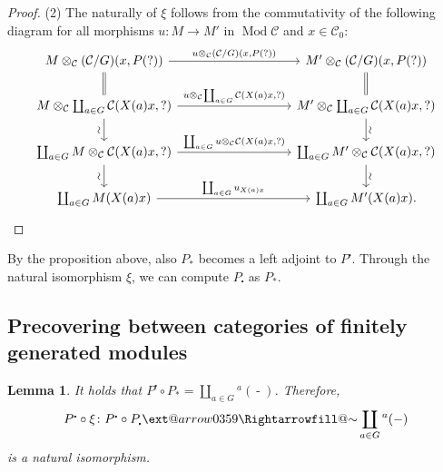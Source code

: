 \documentclass{surv-l}
\makeatletter
\numberwithin{equation}{chapter}
\numberwithin{figure}{chapter}
\theoremstyle{plain}
\newtheorem{lem}[thm]{Lemma}
\theoremstyle{definition}
\theoremstyle{remark}
\newcommand{\Ya}[2][]{\ext@arrow0359\Rightarrowfill@{#1}{#2}}
\newcommand{\Ar}[3]{\ar[from={#1}, to={#2}, #3]}
\DeclareMathOperator{\Mod}{Mod}
\DeclareMathOperator{\blank}{-}
\makeatother
\begin{document}
\begin{proof}
(2) The naturally of $\xi$ follows from the commutativity of the following diagram
for all morphisms $u \colon M \to M'$ in $\Mod{\mathcal{C}}$ and $x \in {\mathcal{C}}_0$:
\begin{equation*}
\begin{tikzcd}[column sep=9em]
M \otimes_{\mathcal{C}} ({\mathcal{C}}/G)(x, P(?)) & M' \otimes_{\mathcal{C}} ({\mathcal{C}}/G)(x, P(?))\\
M \otimes_{\mathcal{C}} \coprod_{a\in G}{\mathcal{C}}(X(a)x, ?) & M' \otimes_{\mathcal{C}} \coprod_{a\in G} {\mathcal{C}}(X(a)x, ?)\\
\coprod_{a\in G} M \otimes_{\mathcal{C}} {\mathcal{C}}(X(a)x, ?) & \coprod_{a\in G} M' \otimes_{\mathcal{C}}  {\mathcal{C}}(X(a)x, ?)\\
\coprod_{a\in G} M(X(a)x) & \coprod_{a\in G} M'(X(a)x).
\Ar{1-1}{1-2}{"{u \otimes_{\mathcal{C}} ({\mathcal{C}}/G)(x, P(?))}"}
\Ar{2-1}{2-2}{"{u \otimes_{\mathcal{C}} \coprod_{a\in G} {\mathcal{C}}(X(a)x, ?)}"}
\Ar{3-1}{3-2}{"{ \coprod_{a\in G} u \otimes_{\mathcal{C}}{\mathcal{C}}(X(a)x, ?)}"}
\Ar{4-1}{4-2}{"\coprod_{a\in G} u_{X(a)x}"}
\Ar{1-1}{2-1}{equal}
\Ar{1-2}{2-2}{equal}
\Ar{2-1}{3-1}{"\rotatebox{90}{$\sim$}" '}
\Ar{2-2}{3-2}{"\rotatebox{90}{$\sim$}"}
\Ar{3-1}{4-1}{"\rotatebox{90}{$\sim$}" '}
\Ar{3-2}{4-2}{"\rotatebox{90}{$\sim$}"}
\end{tikzcd}
\end{equation*}
\end{proof}

By the proposition above, also $P_*$ becomes a left adjoint to $P^{\centerdot}$.
Through the natural isomorphism $\xi$, we can compute $P_{\centerdot}$
as $P_*$.

\subsection{Precovering between categories of finitely generated modules}\begin{lem}\label{lem:up-down=ds-orbit}
It holds that $P^{\centerdot} \circ P_* = \coprod_{a\in G}{}^a(\blank)$.
Therefore,
\[
P^{\centerdot} \circ \xi \colon P^{\centerdot} \circ P_{\centerdot} \Ya{\sim} \coprod_{a\in G}{}^{a}(\blank)
\]
is a natural isomorphism.
\end{lem}
\end{document}
